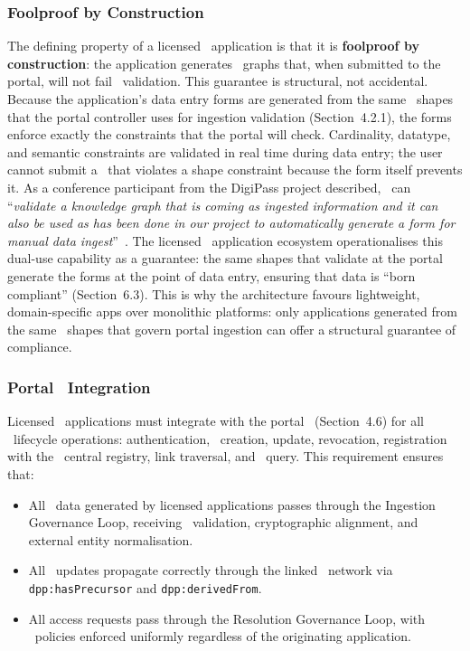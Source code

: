 \subsubsection{Foolproof by Construction}

The defining property of a licensed \DPP\ application is that it is
\textbf{foolproof by construction}: the application generates \RDF\ graphs that,
when submitted to the portal, will not fail \SHACL\ validation. This guarantee
is structural, not accidental. Because the application's data entry forms are
generated from the same \SHACL\ shapes that the portal controller uses for
ingestion validation (Section~4.2.1), the forms enforce exactly the constraints
that the portal will check. Cardinality, datatype, and semantic constraints are
validated in real time during data entry; the user cannot submit a \DPP\ that
violates a shape constraint because the form itself prevents it. As a conference
participant from the DigiPass project described, \SHACL\ can ``\textit{validate
a knowledge graph that is coming as ingested information and it can also be used
as has been done in our project to automatically generate a form for manual data
ingest}''~\cite{dpp4eu2026_day2}. The licensed \DPP\ application ecosystem
operationalises this dual-use capability as a guarantee: the same shapes that
validate at the portal generate the forms at the point of data entry, ensuring
that data is ``born compliant'' (Section~6.3). This is why the architecture
favours lightweight, domain-specific apps over monolithic platforms: only
applications generated from the same \SHACL\ shapes that govern portal ingestion
can offer a structural guarantee of compliance.

\subsubsection{Portal \API\ Integration}

Licensed \DPP\ applications must integrate with the portal \API\ (Section~4.6)
for all \DPP\ lifecycle operations: authentication, \DPP\ creation, update,
revocation, registration with the \EC\ central registry, link traversal, and
\SPARQL\ query. This requirement ensures that:

\begin{itemize}
\item All \DPP\ data generated by licensed applications passes through the
Ingestion Governance Loop, receiving \SHACL\ validation, cryptographic
alignment, and external entity normalisation.
\item All \DPP\ updates propagate correctly through the linked \DPP\ network via
\texttt{dpp:hasPrecursor} and \texttt{dpp:derivedFrom}.
\item All access requests pass through the Resolution Governance Loop, with
\ABAC\ policies enforced uniformly regardless of the originating application.
\end{itemize}

